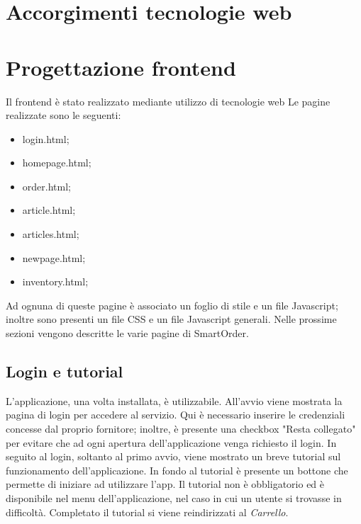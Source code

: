 \documentclass[12pt, a4paper, titlepage]{report}
\begin{document}
	\section{Accorgimenti tecnologie web}
	
	\section{Progettazione frontend}
	Il frontend è stato realizzato mediante utilizzo di tecnologie web
	Le pagine realizzate sono le seguenti:
	\begin{itemize}
		\item login.html;
		\item homepage.html;
		\item order.html;
		\item article.html;
		\item articles.html;
		\item newpage.html;
		\item inventory.html;
	\end{itemize}
	Ad ognuna di queste pagine è associato un foglio di stile e un file Javascript; inoltre sono presenti un file CSS e un file Javascript generali. Nelle prossime sezioni vengono descritte le varie pagine di SmartOrder.
	
	\subsection{Login e tutorial}
	
	L'applicazione, una volta installata, è utilizzabile. All'avvio viene mostrata la pagina di login per accedere al servizio. Qui è necessario inserire le credenziali concesse dal proprio fornitore; inoltre, è presente una checkbox "Resta collegato" per evitare che ad ogni apertura dell'applicazione venga richiesto il login. In seguito al login, soltanto al primo avvio, viene mostrato un breve tutorial sul funzionamento dell'applicazione. In fondo al tutorial è presente un bottone che permette di iniziare ad utilizzare l'app. Il tutorial non è obbligatorio ed è disponibile nel menu dell'applicazione, nel caso in cui un utente si trovasse in difficoltà. Completato il tutorial si viene reindirizzati al \textit{Carrello}.
	
\end{document}
